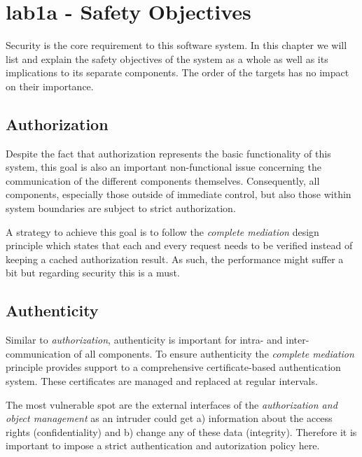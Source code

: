 \documentclass[12pt,a4paper,titlepage,oneside]{scrartcl}
\begin{document}
\maketitle
\setcounter{section}{0}
\setcounter{tocdepth}{2}
\tableofcontents

%
%

\section{lab1a - Safety Objectives}
Security is the core requirement to this software system. In this chapter we will list and explain the
safety objectives of the system as a whole as well as its implications to its separate components. The order
of the targets has no impact on their importance.


\subsection{Authorization}
Despite the fact that authorization represents the basic functionality of this system, this goal is also
an important non-functional issue concerning the communication of the different components themselves. Consequently, all components,
especially those outside of immediate control, but also those within system boundaries are subject to strict authorization.

A strategy to achieve this goal is to follow the \emph{complete mediation} design principle which states that each and
every request needs to be verified instead of keeping a cached authorization result. As such, the performance might suffer
a bit but regarding security this is a must.


\subsection{Authenticity}
Similar to \emph{authorization}, authenticity is important for intra- and inter-communication of all components. To
ensure authenticity the \emph{complete mediation} principle provides support to a comprehensive certificate-based authentication
system. These certificates are managed and replaced at regular intervals.

The most vulnerable spot are the external interfaces of the \emph{authorization and object management} as an intruder could get
a) information about the access rights (confidentiality) and b) change any of these data (integrity). Therefore it is important to impose
a strict authentication and autorization policy here.
\end{document}
